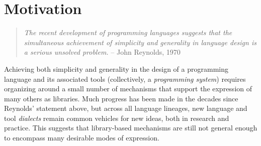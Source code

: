 \vspace{-25pt}
\section{Motivation}\label{motivation}
\begin{quote}\textit{The recent development of programming languages suggests that the simul\-taneous achievement of simplicity 
and generality in language design is a serious unsolved 
problem.} -- John Reynolds, 1970 \cite{Reynolds70}\end{quote}
Achieving both simplicity and generality in the design of a programming language and its associated tools (collectively, a \emph{programming system}) requires organizing around a small number of mechanisms that support the expression of many others   as libraries. %
Much progress has been made in the decades since Reynolds' statement above, but  across all language lineages,  new language and tool \emph{dialects} remain common vehicles for new ideas, both in research and practice. This suggests that library-based mechanisms are still not general enough to encompass many desirable modes of expression. %

